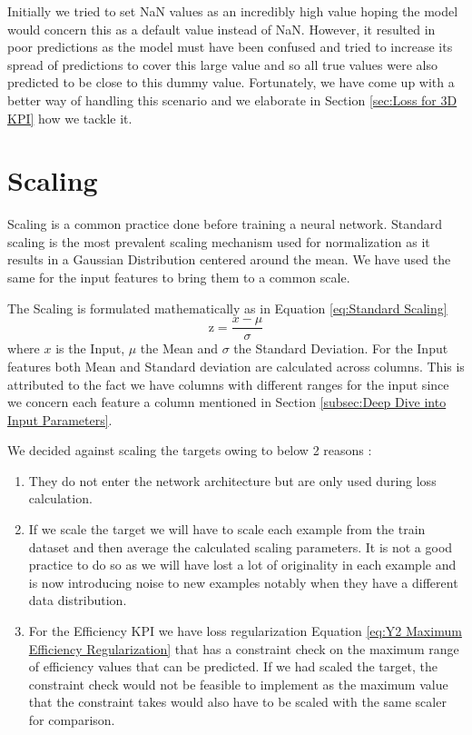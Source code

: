 \documentclass{report} %
\begin{document}
Initially we tried to set \ac{NaN} values as an incredibly high value hoping the model would concern this as a default value instead of \ac{NaN}.
However, it resulted in poor predictions as the model must have been confused and tried to increase its spread of predictions to cover this large value and so all 
true values were also predicted to be close to this dummy value.
Fortunately, we have come up with a better way of handling this scenario and we elaborate in Section \ref{sec:Loss for 3D KPI} how we tackle it.

\section{Scaling}\label{sec:Scaling}

Scaling is a common practice done before training a neural network. 
Standard scaling is the most prevalent scaling mechanism used for normalization as it results in a Gaussian Distribution centered around the mean.
We have used the same for the input features to bring them to a common scale. 

The Scaling is formulated mathematically as in Equation \ref{eq:Standard Scaling}
\begin{equation}
    \text{z} = \frac{x - \mu}{\sigma}
    \label{eq:Standard Scaling}
\end{equation} 
where $x$ is the Input, $\mu$ the Mean and $\sigma$ the Standard Deviation.
For the Input features both Mean and Standard deviation are calculated across columns. 
This is attributed to the fact we have columns with different ranges for the input since we concern each feature a column mentioned in Section \ref{subsec:Deep Dive into Input Parameters}.

We decided against scaling the targets owing to below 2 reasons :
\begin{enumerate}
    \item They do not enter the network architecture but are only used during loss calculation.
    \item If we scale the target we will have to scale each example from the train dataset and then average the calculated scaling parameters.
    It is not a good practice to do so as we will have lost a lot of originality in each example and is now introducing noise to new examples notably when they have a different data distribution.
    \item For the Efficiency \ac{KPI} we have loss regularization Equation \ref{eq:Y2 Maximum Efficiency Regularization} that has a constraint 
    check on the maximum range of efficiency values that can be predicted. If we had scaled the target, the constraint check would not be feasible to 
    implement as the maximum value that the constraint takes would also have to be scaled with the same scaler for comparison.
\end{enumerate}
\end{document}

